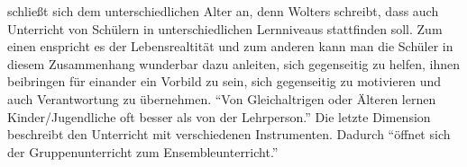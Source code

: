 schließt sich dem unterschiedlichen Alter an, denn Wolters schreibt, dass auch
Unterricht von Schülern in unterschiedlichen Lernniveaus stattfinden soll. Zum
einen enspricht es der Lebensrealtität und zum anderen kann man die Schüler in
diesem Zusammenhang wunderbar dazu anleiten, sich gegenseitig zu helfen, ihnen
beibringen für einander ein Vorbild zu sein, sich gegenseitig zu motivieren und
auch Verantwortung zu übernehmen. \enquote{Von Gleichaltrigen oder Älteren lernen
Kinder/Jugendliche oft besser als von der Lehrperson.}
\autocite[87]{ernst:die_zukunftsfaehige_musikschule} Die letzte Dimension
beschreibt den Unterricht mit verschiedenen Instrumenten. Dadurch \enquote{öffnet sich
der Gruppenunterricht zum Ensembleunterricht.}
\autocite[87]{ernst:die_zukunftsfaehige_musikschule}
